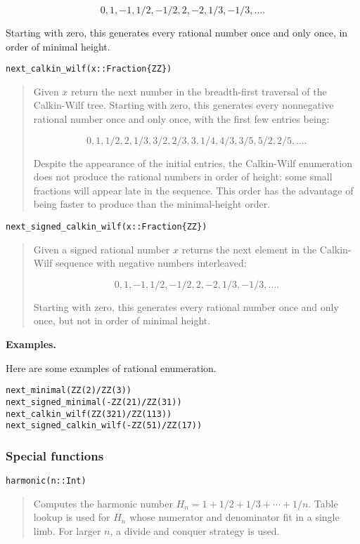 \documentclass[a4paper,10pt]{article}
\newcommand{\desc}[1]{\vspace{-3mm}\begin{quote}#1\end{quote}}
\begin{document}
{{{$$0, 1, -1, 1/2, -1/2, 2, -2, 1/3, -1/3, \ldots.$$

Starting with zero, this generates every rational number once and only once,
in order of minimal height.}

\begin{lstlisting}
next_calkin_wilf(x::Fraction{ZZ})
\end{lstlisting}

\desc{Given $x$ return the next number in the breadth-first traversal of the
Calkin-Wilf tree. Starting with zero, this generates every nonnegative
rational number once and only once, with the first few entries being:

$$0, 1, 1/2, 2, 1/3, 3/2, 2/3, 3, 1/4, 4/3, 3/5, 5/2, 2/5, \ldots.$$

Despite the appearance of the initial entries, the Calkin-Wilf enumeration 
does not produce the rational numbers in order of height: some small fractions
will appear late in the sequence. This order has the advantage of being faster 
to produce than the minimal-height order.}

\begin{lstlisting}
next_signed_calkin_wilf(x::Fraction{ZZ})
\end{lstlisting}

\desc{Given a signed rational number $x$ returns the next element in the
Calkin-Wilf sequence with negative numbers interleaved:

$$0, 1, -1, 1/2, -1/2, 2, -2, 1/3, -1/3, \ldots.$$

Starting with zero, this generates every rational number once and only once,
but not in order of minimal height.}

\textbf{Examples.}

Here are some examples of rational enumeration.

\begin{lstlisting}
next_minimal(ZZ(2)/ZZ(3))
next_signed_minimal(-ZZ(21)/ZZ(31))
next_calkin_wilf(ZZ(321)/ZZ(113))
next_signed_calkin_wilf(-ZZ(51)/ZZ(17))
\end{lstlisting}

\subsubsection{Special functions}

\begin{lstlisting}
harmonic(n::Int)
\end{lstlisting}

\desc{Computes the harmonic number $H_n = 1 + 1/2 + 1/3 + \cdots + 1/n$.
Table lookup is used for $H_n$ whose numerator and denominator 
fit in a single limb. For larger $n$, a divide and conquer strategy is used.}

}}
\end{document}
